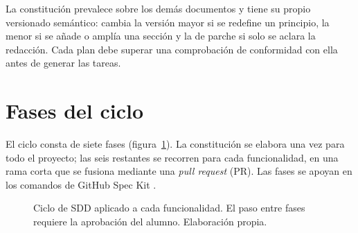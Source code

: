 La constitución prevalece sobre los demás documentos y tiene su propio versionado semántico: cambia la versión mayor si se redefine un principio, la menor si se añade o amplía una sección y la de parche si solo se aclara la redacción. Cada plan debe superar una comprobación de conformidad con ella antes de generar las tareas.

\section{Fases del ciclo}\label{sec:Fases}

El ciclo consta de siete fases (figura~\ref{fig:CicloSDD}). La constitución se elabora una vez para todo el proyecto; las seis restantes se recorren para cada funcionalidad, en una rama corta que se fusiona mediante una \emph{pull request} (PR). Las fases se apoyan en los comandos de GitHub Spec Kit \citep{github2026speckit,github2026speckitquickstart}.

\begin{figure}[htbp]
	\centering
	\caption{Ciclo de SDD aplicado a cada funcionalidad. El paso entre fases requiere la aprobación del alumno. Elaboración propia.}
	\label{fig:CicloSDD}
\end{figure}

